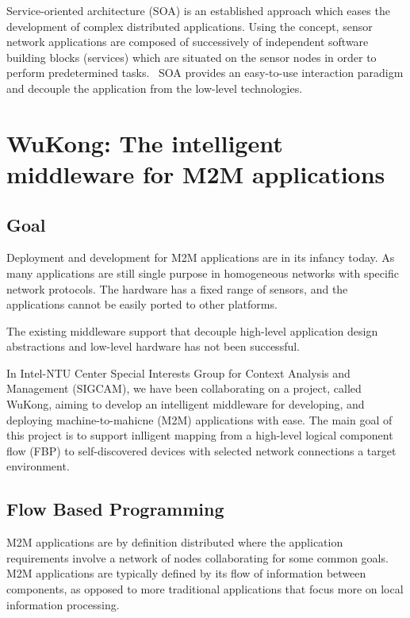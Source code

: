 Service-oriented architecture (SOA) is an established approach which eases the
development of complex distributed applications. Using the concept, sensor
network applications are composed of successively of independent software
building blocks (services) which are situated on the sensor nodes in order to
perform predetermined tasks.~\cite{Neumann2010, Marin-Perianu2007} SOA provides
an easy-to-use interaction paradigm and decouple the application from the
low-level technologies.

\section{WuKong: The intelligent middleware for M2M applications}

\subsection{Goal}

Deployment and development for M2M applications are in its infancy today. As
many applications are still single purpose in homogeneous networks with
specific network protocols. The hardware has a fixed range of sensors, and the
applications cannot be easily ported to other platforms.

The existing middleware support that decouple high-level application design
abstractions and low-level hardware has not been successful.

In Intel-NTU Center Special Interests Group for Context Analysis and Management 
(SIGCAM), we have been collaborating on a project, called WuKong, aiming to develop 
an intelligent middleware for developing, and deploying machine-to-mahicne 
(M2M) applications with ease. The main goal of this project is to support
inlligent mapping from a high-level logical component flow (FBP) to
self-discovered devices with selected network connections a target
environment\cite{Reijers}.

\subsection{Flow Based Programming}

M2M applications are by definition distributed where the application
requirements involve a network of nodes collaborating for some common 
goals. M2M applications are typically defined by its flow of information
between components, as opposed to more traditional applications that focus more
on local information processing.

